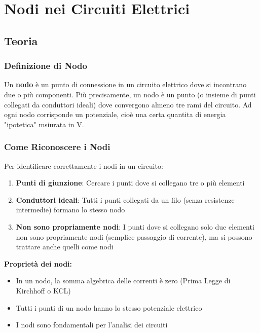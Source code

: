 \documentclass[a4paper,12pt]{article}
\begin{document}
\newpage
\section{Nodi nei Circuiti Elettrici}

\subsection{Teoria}

\subsubsection{Definizione di Nodo}
Un \textbf{nodo} è un punto di connessione in un circuito elettrico dove si incontrano due o più componenti. Più precisamente, un nodo è un punto (o insieme di punti collegati da conduttori ideali) dove convergono almeno tre rami del circuito. Ad ogni nodo corrisponde un potenziale, cioè una certa quantita di energia "ipotetica" msiurata in V.

\subsubsection{Come Riconoscere i Nodi}

Per identificare correttamente i nodi in un circuito:

\begin{enumerate}
    \item \textbf{Punti di giunzione}: Cercare i punti dove si collegano tre o più elementi
    \item \textbf{Conduttori ideali}: Tutti i punti collegati da un filo (senza resistenze intermedie) formano lo stesso nodo
    \item \textbf{Non sono propriamente nodi}: I punti dove si collegano solo due elementi non sono propriamente nodi (semplice passaggio di corrente), ma si possono trattare anche quelli come nodi
\end{enumerate}

\textbf{Proprietà dei nodi:}
\begin{itemize}
    \item In un nodo, la somma algebrica delle correnti è zero (Prima Legge di Kirchhoff o KCL)
    \item Tutti i punti di un nodo hanno lo stesso potenziale elettrico
    \item I nodi sono fondamentali per l'analisi dei circuiti
\end{itemize}
\end{document}
